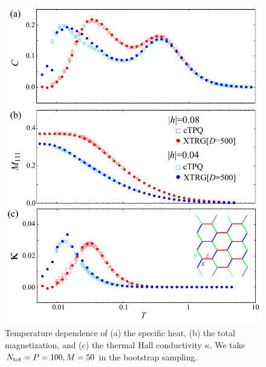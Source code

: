 \documentclass[reprint,amsmath,amssymb,aps,prx]{revtex4-2}
\begin{document}
\begin{figure}[tbh] 
\begin{center} 
\includegraphics[width=0.9\linewidth]{compXTRG_3_o.pdf}
\vspace{-0.5cm} 
\caption{Temperature dependence of (a) the specific heat, (b) the total magnetization, and
(c) the thermal Hall conductivity $\kappa$. 
We take $N_{\rm tot}=P=100,M=50$ in the bootstrap sampling.}
\label{comp_XTRG}
\end{center}
\end{figure}
\end{document}
